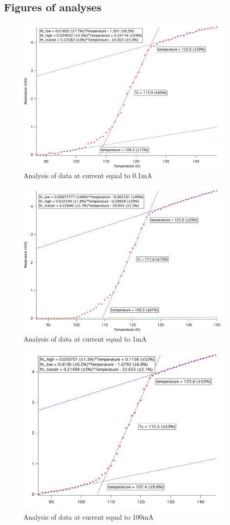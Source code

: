 \documentclass[prb,preprint]{revtex4-1}
\begin{document}
\clearpage
\begin{appendix}
\section{Figures of analyses}

\begin{figure}[h]
\centering
\includegraphics[width=11cm]{ybco01ma.png}
\caption{Analysis of data at current equal to 0.1mA }
\label{ybcoanalysis2}
\end{figure}

\begin{figure}[h]
\centering
\includegraphics[width=11cm]{ybco1ma.png}
\caption{Analysis of data at current equal to 1mA }
\label{ybcoanalysis3}
\end{figure}

\begin{figure}[h]
\centering
\includegraphics[width=11cm]{ybco100ma.png}
\caption{Analysis of data at current equal to 100mA}
\label{ybcoanalysis4}
\end{figure}

\end{appendix}
\end{document}
